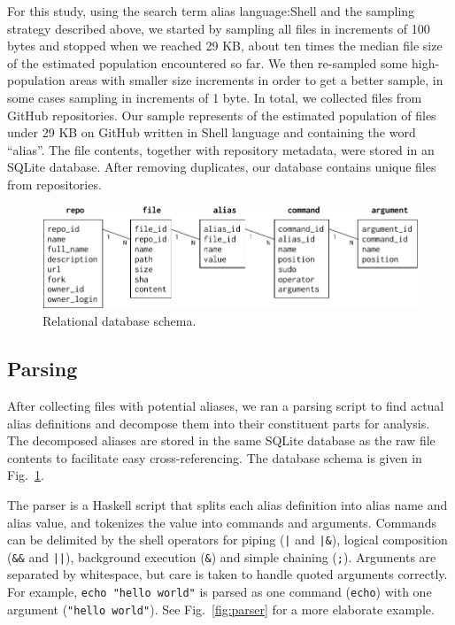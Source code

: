 \documentclass[smallextended,natbib]{svjour3}
\newcommand{\num}[1]{\numprint{#1}}
\newcommand{\per}[1]{\numprint[\%]{#1}}
\newenvironment{CVerbatim}
  {\center\BVerbatim}
  {\endBVerbatim\endcenter}
\begin{document}
For this study, using the search term
\begin{CVerbatim}
alias language:Shell
\end{CVerbatim}
and the sampling strategy described above, we started by sampling all files in increments of 100 bytes and stopped when we reached 29 KB, about ten times the median file size of the estimated population encountered so far.
We then re-sampled some high-population areas with smaller size increments in order to get a better sample, in some cases sampling in increments of 1 byte.
In total, we collected \num{844140} files from \num{304361} GitHub repositories.
Our sample represents \per{94.09} of the estimated population of \num{897182} files under 29 KB on GitHub written in Shell language and containing the word ``alias''.
The file contents, together with repository metadata, were stored in an SQLite database.
After removing duplicates, our database contains \num{372816} unique files from \num{205126} repositories.

\begin{figure}
    \centering
    \includegraphics[width=\columnwidth]{fig-schema.pdf}
    \caption{Relational database schema.}
    \label{fig:schema}
\end{figure}

\subsection{Parsing}

After collecting files with potential aliases, we ran a parsing script to find actual alias definitions and decompose them into their constituent parts for analysis.
The decomposed aliases are stored in the same SQLite database as the raw file contents to facilitate easy cross-referencing.
The database schema is given in Fig.~\ref{fig:schema}.

The parser is a Haskell script that splits each alias definition into alias name and alias value, and tokenizes the value into commands and arguments.
Commands can be delimited by the shell operators for piping (\verb!|! and \verb!|&!), logical composition (\verb|&&| and \verb!||!), background execution (\verb|&|) and simple chaining (\verb|;|).
Arguments are separated by whitespace, but care is taken to handle quoted arguments correctly. 
For example, \verb|echo "hello world"| is parsed as one command (\texttt{echo}) with one argument (\texttt{"hello world"}).
See Fig.~\ref{fig:parser} for a more elaborate example.
\end{document}
